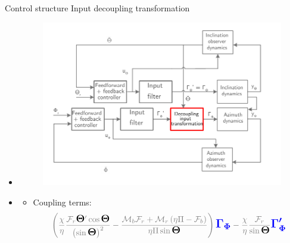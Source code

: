\documentclass{beamer}
\begin{document}
\begin{frame}{Control structure}
Input decoupling transformation

\begin{itemize}

	\item <1|only@1> [] \begin{figure}
		\includegraphics[width=1\textwidth]{images/ControlStrategy1.pdf}
	\end{figure}
	\item <2|only@2> []
	\begin{itemize} 
		\item Coupling terms:
		\footnotesize\begin{equation*}
		\color{gray} \left( {\frac{\chi }{\eta }\frac{{{\mathcal{F}_r}\color{black}\mathlarger{\mathlarger{\boldsymbol{\Theta}}}\color{gray} '\cos \color{black}\mathlarger{\mathlarger{\boldsymbol{\Theta}}}\color{gray} }}{{{{\left( {\sin \color{black}\mathlarger{\mathlarger{\boldsymbol{\Theta}}}\color{gray} } \right)}^2}}} - \frac{{{\mathcal{M}_b}{\mathcal{F}_r} + {\mathcal{M}_r}\left( {\eta \Pi  - {\mathcal{F}_b}} \right)}}{{\eta \Pi \sin \color{black}\mathlarger{\mathlarger{\boldsymbol{\Theta}}}\color{gray} }}} \right){\color{blue}\mathlarger{\mathlarger{\boldsymbol{\Gamma _{\Phi}}}}}\color{gray} - \frac{\chi }{\eta }\frac{{{\mathcal{F}_r}}}{{\sin \color{black}\mathlarger{\mathlarger{\boldsymbol{\Theta}}}\color{gray} }}\color{blue}\mathlarger{\mathlarger{\boldsymbol{\Gamma_{\Phi}'}}}\color{gray}
		\end{equation*}
		

\end{itemize}
\end{itemize}
\end{frame}
\end{document}
